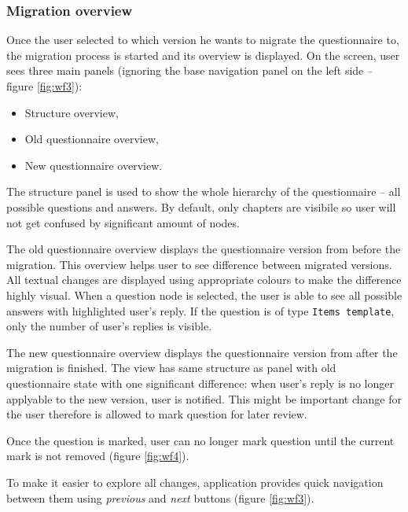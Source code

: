 

\subsubsection*{Migration overview}

Once the user selected to which version he wants to migrate the questionnaire to, the migration process is started and its overview is displayed.
On the screen, user sees three main panels (ignoring the base navigation panel on the left side -- figure \ref{fig:wf3}):

\begin{itemize}
    \item Structure overview,
    \item Old questionnaire overview,
    \item New questionnaire overview.
\end{itemize}

The structure panel is used to show the whole hierarchy of the questionnaire -- all possible questions and answers.
By default, only chapters are visibile so user will not get confused by significant amount of nodes.

The old questionnaire overview displays the questionnaire version from before the migration.
This overview helps user to see difference between migrated versions.
All textual changes are displayed using appropriate colours to make the difference highly visual.
When a question node is selected, the user is able to see all possible answers with highlighted user's reply.
If the question is of type \texttt{Items template}, only the number of user's replies is visible.

The new questionnaire overview displays the questionnaire version from after the migration is finished.
The view has same structure as panel with old questionnaire state with one significant difference: when user's reply is no longer applyable to the new version, user is notified.
This might be important change for the user therefore is allowed to mark question for later review.

Once the question is marked, user can no longer mark question until the current mark is not removed (figure \ref{fig:wf4}).

To make it easier to explore all changes, application provides quick navigation between them using \textit{previous} and \textit{next} buttons (figure \ref{fig:wf3}).

